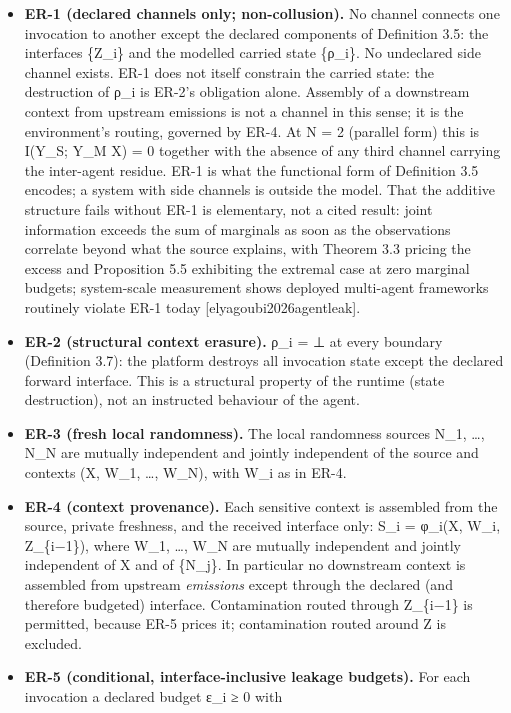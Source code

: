 \documentclass[
  11pt,
]{article}
\begin{document}
\begin{itemize}
\item
  \textbf{ER-1 (declared channels only; non-collusion).} No channel
  connects one invocation to another except the declared components of
  Definition 3.5: the interfaces \{Z\_i\} and the modelled carried state
  \{ρ\_i\}. No undeclared side channel exists. ER-1 does not itself
  constrain the carried state: the destruction of ρ\_i is ER-2's
  obligation alone. Assembly of a downstream context from upstream
  emissions is not a channel in this sense; it is the environment's
  routing, governed by ER-4. At N = 2 (parallel form) this is I(Y\_S;
  Y\_M \textbar{} X) = 0 together with the absence of any third channel
  carrying the inter-agent residue. ER-1 is what the functional form of
  Definition 3.5 encodes; a system with side channels is outside the
  model. That the additive structure fails without ER-1 is elementary,
  not a cited result: joint information exceeds the sum of marginals as
  soon as the observations correlate beyond what the source explains,
  with Theorem 3.3 pricing the excess and Proposition 5.5 exhibiting the
  extremal case at zero marginal budgets; system-scale measurement shows
  deployed multi-agent frameworks routinely violate ER-1 today
  {[}elyagoubi2026agentleak{]}.
\item
  \textbf{ER-2 (structural context erasure).} ρ\_i = ⊥ at every boundary
  (Definition 3.7): the platform destroys all invocation state except
  the declared forward interface. This is a structural property of the
  runtime (state destruction), not an instructed behaviour of the agent.
\item
  \textbf{ER-3 (fresh local randomness).} The local randomness sources
  N\_1, \ldots, N\_N are mutually independent and jointly independent of
  the source and contexts (X, W\_1, \ldots, W\_N), with W\_i as in ER-4.
\item
  \textbf{ER-4 (context provenance).} Each sensitive context is
  assembled from the source, private freshness, and the received
  interface only: S\_i = φ\_i(X, W\_i, Z\_\{i−1\}), where W\_1, \ldots,
  W\_N are mutually independent and jointly independent of X and of
  \{N\_j\}. In particular no downstream context is assembled from
  upstream \emph{emissions} except through the declared (and therefore
  budgeted) interface. Contamination routed through Z\_\{i−1\} is
  permitted, because ER-5 prices it; contamination routed around Z is
  excluded.
\item
  \textbf{ER-5 (conditional, interface-inclusive leakage budgets).} For
  each invocation a declared budget ε\_i ≥ 0 with
\end{itemize}
\end{document}
